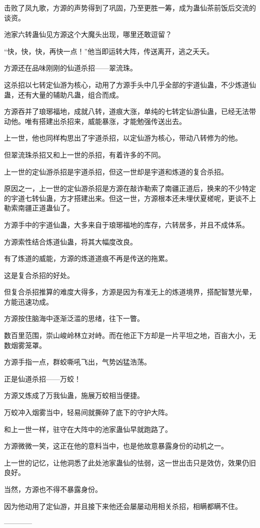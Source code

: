 \begin{this_body}
击败了凤九歌，方源的声势得到了巩固，乃至更胜一筹，成为蛊仙茶前饭后交流的谈资。

池家六转蛊仙见方源这个大魔头出现，哪里还敢逗留？

“快，快，快，再快一点！”他当即运转大阵，传送离开，逃之夭夭。

方源还在品味刚刚的仙道杀招——翠流珠。

这杀招以七转定仙游为核心，动用了方源手头中几乎全部的宇道仙蛊，不少炼道仙蛊，还有大量的辅助凡蛊，组合而成。

方源吞并了琅琊福地，成就八转，道痕大涨，单纯的七转定仙游仙蛊，已经无法带动他。唯有搭建出杀招来，威能暴涨，才能勉强传送出去。

上一世，他也同样构思出了宇道杀招，以定仙游为核心，带动八转修为的他。

但翠流珠杀招又和上一世的杀招，有着许多的不同。

上一世的定仙游杀招是宇道杀招，但这一世却是宇道和炼道的复合杀招。

原因之一，上一世的定仙游杀招是方源在敲诈勒索了南疆正道后，换来的不少特定的宇道七转仙蛊，方才搭建出来。但这一世，方源根本还未埋伏夏槎呢，更谈不上勒索南疆正道蛊仙了。

方源手中的宇道仙蛊，大多来自于琅琊福地的库存，六转居多，并且不成体系。

方源索性结合炼道仙蛊，将其大幅度改良。

有了炼道的威能，方源的炼道道痕不再是传送的拖累。

这是复合杀招的好处。

但复合杀招推算的难度大得多，方源是因为有准无上的炼道境界，搭配智慧光晕，方能迅速功成。

方源按住脑海中逐渐泛滥的思绪，往下一瞥。

数百里范围，崇山峻岭林立对峙。而在他正下方却是一片平坦之地，百亩大小，无数烟雾笼罩。

方源手指一点，群蛟嘶吼飞出，气势凶猛浩荡。

正是仙道杀招——万蛟！

方源又炼成了万我仙蛊，施展万蛟相当便捷。

万蛟冲入烟雾当中，轻易间就撕碎了底下的守护大阵。

和上一世一样，驻守在大阵中的池家蛊仙早就跑路了。

方源微微一笑，这正在他的意料当中，也是他故意暴露身份的动机之一。

上一世的记忆，让他洞悉了此处池家蛊仙的怯弱，这一世出击只是效仿，效果仍旧良好。

当然，方源也不得不暴露身份。

因为他动用了定仙游，并且接下来他还会屡屡动用相关杀招，相瞒都瞒不住。

------------

\end{this_body}


